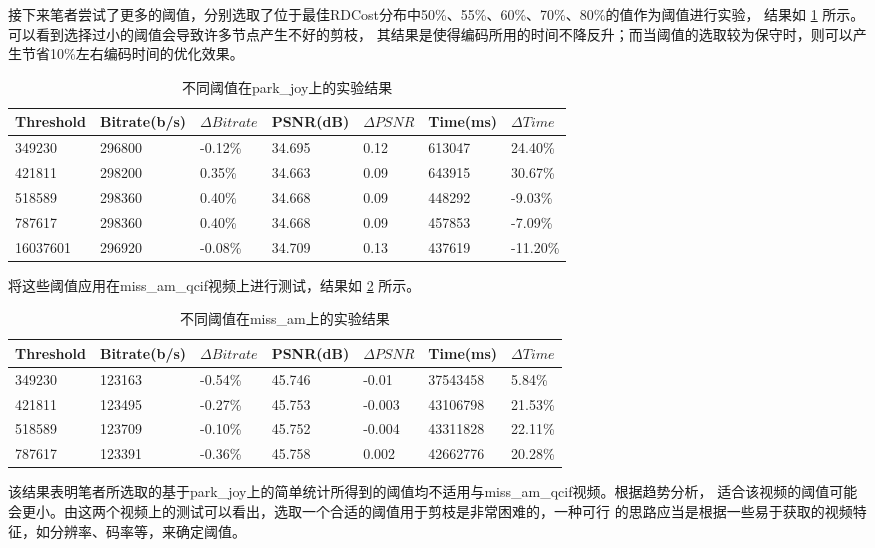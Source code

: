 接下来笔者尝试了更多的阈值，分别选取了位于最佳RDCost分布中50\%、55\%、60\%、70\%、80\%的值作为阈值进行实验，
结果如 \ref{tab:result-more-threshold-park} 所示。可以看到选择过小的阈值会导致许多节点产生不好的剪枝，
其结果是使得编码所用的时间不降反升；而当阈值的选取较为保守时，则可以产生节省10\%左右编码时间的优化效果。

\begin{table}[H]
  \centering
    \caption{不同阈值在park\_joy上的实验结果}
    \label{tab:result-more-threshold-park}
    \begin{tabularx}{\linewidth}{XXXXXXX}
      \toprule[1.5pt]
      Threshold & Bitrate(b/s) & $\Delta Bitrate$ & PSNR(dB) & $\Delta PSNR$ & Time(ms) & $\Delta Time$ \\
      \midrule[1pt]
      349230 & 296800 & -0.12\% & 34.695 & 0.12 & 613047 & 24.40\% \\
      421811 & 298200 & 0.35\% & 34.663 & 0.09 & 643915 & 30.67\% \\
      518589 & 298360 & 0.40\% & 34.668 & 0.09 & 448292 & -9.03\% \\
      787617 & 298360 & 0.40\% & 34.668 & 0.09 & 457853 & -7.09\% \\
      16037601 & 296920 & -0.08\% & 34.709 & 0.13 & 437619 & -11.20\% \\
      \bottomrule[1.5pt]
    \end{tabularx}
\end{table}


将这些阈值应用在miss\_am\_qcif视频上进行测试，结果如 \ref{tab:result-more-threshold-miss} 所示。


\begin{table}[H]
  \centering
    \caption{不同阈值在miss\_am上的实验结果}
    \label{tab:result-more-threshold-miss}
    \begin{tabularx}{\linewidth}{XXXXXXX}
      \toprule[1.5pt]
      Threshold & Bitrate(b/s) & $\Delta Bitrate$ & PSNR(dB) & $\Delta PSNR$ & Time(ms) & $\Delta Time$ \\
      \midrule[1pt]
      349230 & 123163 & -0.54\% & 45.746 & -0.01 & 37543458 & 5.84\% \\
      421811 & 123495 & -0.27\% & 45.753 & -0.003 & 43106798 & 21.53\% \\
      518589 & 123709 & -0.10\% & 45.752 & -0.004 & 43311828 & 22.11\% \\
      787617 & 123391 & -0.36\% & 45.758  & 0.002 & 42662776 & 20.28\% \\
      \bottomrule[1.5pt]
    \end{tabularx}
\end{table}

该结果表明笔者所选取的基于park\_joy上的简单统计所得到的阈值均不适用与miss\_am\_qcif视频。根据趋势分析，
适合该视频的阈值可能会更小。由这两个视频上的测试可以看出，选取一个合适的阈值用于剪枝是非常困难的，一种可行
的思路应当是根据一些易于获取的视频特征，如分辨率、码率等，来确定阈值。